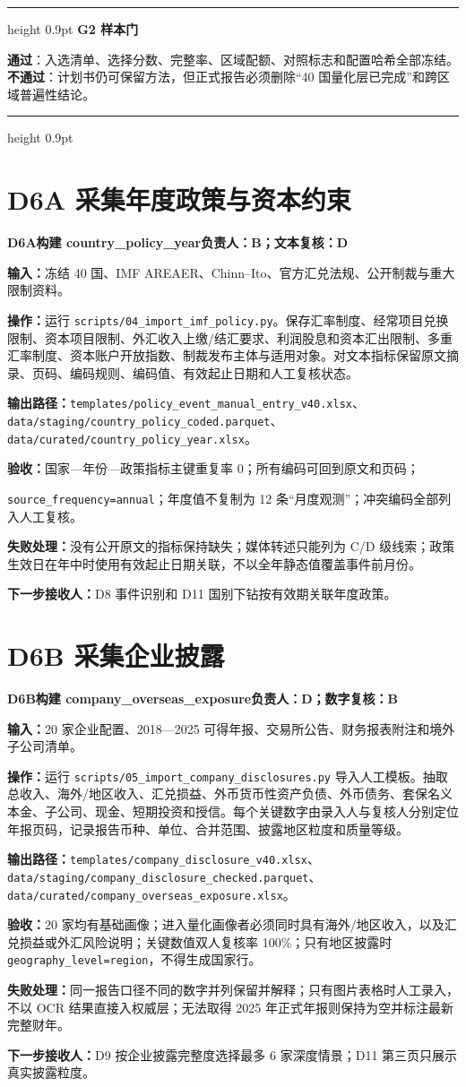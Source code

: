 \documentclass[UTF8,fontset=windows,12pt,openany]{ctexbook}
\newenvironment{gatebox}[1][]{%
  \par\medskip\noindent\begin{center}\begin{minipage}{0.93\textwidth}%
  \color{GoldLine}\hrule height 0.9pt\vspace{0.45em}%
  \textbf{#1}\par\smallskip\color{black}%
}{%
  \par\vspace{0.35em}\color{GoldLine}\hrule height 0.9pt%
  \end{minipage}\end{center}\medskip%
}
\newcommand{\Field}[1]{{\small\nolinkurl{#1}}}
\newcommand{\File}[1]{{\small\nolinkurl{#1}}}
\newcommand{\StepTitle}[3]{%
  \noindent\colorbox{DeepNavy}{\parbox{0.965\textwidth}{\color{white}\Large\bfseries #1\quad #2\hfill\normalsize #3}}\par\medskip
}
\newcommand{\CardRow}[2]{\noindent\textbf{#1：}#2\par}
\newcommand{\Pass}{\textcolor{DeepNavy}{\textbf{通过}}}
\newcommand{\Fail}{\textcolor{TextGray}{\textbf{不通过}}}
\begin{document}
\begin{gatebox}[G2 样本门]
\Pass：入选清单、选择分数、完整率、区域配额、对照标志和配置哈希全部冻结。\Fail：计划书仍可保留方法，但正式报告必须删除“40 国量化层已完成”和跨区域普遍性结论。
\end{gatebox}

\newpage
\section{D6A 采集年度政策与资本约束}
\StepTitle{D6A}{构建 country\_policy\_year}{负责人：B；文本复核：D}
\CardRow{输入}{冻结 40 国、IMF AREAER、Chinn--Ito、官方汇兑法规、公开制裁与重大限制资料。}
\CardRow{操作}{运行 \File{scripts/04_import_imf_policy.py}。保存汇率制度、经常项目兑换限制、资本项目限制、外汇收入上缴/结汇要求、利润股息和资本汇出限制、多重汇率制度、资本账户开放指数、制裁发布主体与适用对象。对文本指标保留原文摘录、页码、编码规则、编码值、有效起止日期和人工复核状态。}
\CardRow{输出路径}{\File{templates/policy_event_manual_entry_v40.xlsx}、\File{data/staging/country_policy_coded.parquet}、\File{data/curated/country_policy_year.xlsx}。}
\CardRow{验收}{国家—年份—政策指标主键重复率 0；所有编码可回到原文和页码；\par\Field{source_frequency=annual}；年度值不复制为 12 条“月度观测”；冲突编码全部列入人工复核。}
\CardRow{失败处理}{没有公开原文的指标保持缺失；媒体转述只能列为 C/D 级线索；政策生效日在年中时使用有效起止日期关联，不以全年静态值覆盖事件前月份。}
\CardRow{下一步接收人}{D8 事件识别和 D11 国别下钻按有效期关联年度政策。}

\section{D6B 采集企业披露}
\StepTitle{D6B}{构建 company\_overseas\_exposure}{负责人：D；数字复核：B}
\CardRow{输入}{20 家企业配置、2018—2025 可得年报、交易所公告、财务报表附注和境外子公司清单。}
\CardRow{操作}{运行 \File{scripts/05_import_company_disclosures.py} 导入人工模板。抽取总收入、海外/地区收入、汇兑损益、外币货币性资产负债、外币债务、套保名义本金、子公司、现金、短期投资和授信。每个关键数字由录入人与复核人分别定位年报页码，记录报告币种、单位、合并范围、披露地区粒度和质量等级。}
\CardRow{输出路径}{\File{templates/company_disclosure_v40.xlsx}、\File{data/staging/company_disclosure_checked.parquet}、\File{data/curated/company_overseas_exposure.xlsx}。}
\CardRow{验收}{20 家均有基础画像；进入量化画像者必须同时具有海外/地区收入，以及汇兑损益或外汇风险说明；关键数值双人复核率 100\%；只有地区披露时 \Field{geography_level=region}，不得生成国家行。}
\CardRow{失败处理}{同一报告口径不同的数字并列保留并解释；只有图片表格时人工录入，不以 OCR 结果直接入权威层；无法取得 2025 年正式年报则保持为空并标注最新完整财年。}
\CardRow{下一步接收人}{D9 按企业披露完整度选择最多 6 家深度情景；D11 第三页只展示真实披露粒度。}
\end{document}
